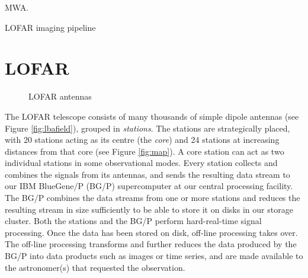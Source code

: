 \documentclass{llncs}
\begin{document}
MWA.

LOFAR imaging pipeline \cite{Romein:10a}

\section{LOFAR}
\label{Sec:LOFAR}

\begin{figure}[ht]
\hfill
{}
\hfill
{}
\caption{LOFAR antennas}
\end{figure}

The LOFAR telescope consists of many thousands of simple dipole antennas (see Figure \ref{fig:lbafield}), grouped in \emph{stations}. The stations are strategically placed, with 20 stations acting as its centre (the \emph{core}) and 24 stations at increasing distances from that core (see Figure \ref{fig:map}). A core station can act as two individual stations in some observational modes. Every station collects and combines the signals from its antennas, and sends the resulting data stream to our IBM BlueGene/P (BG/P) supercomputer at our central processing facility. The BG/P combines the data streams from one or more stations and reduces the resulting stream in size sufficiently to be able to store it on disks in our storage cluster. Both the stations and the BG/P perform hard-real-time signal processing. Once the data has been stored on disk, off-line processing takes over. The off-line processing transforms and further reduces the data produced by the BG/P into data products such as images or time series, and are made available to the astronomer(s) that requested the observation.
\end{document}
